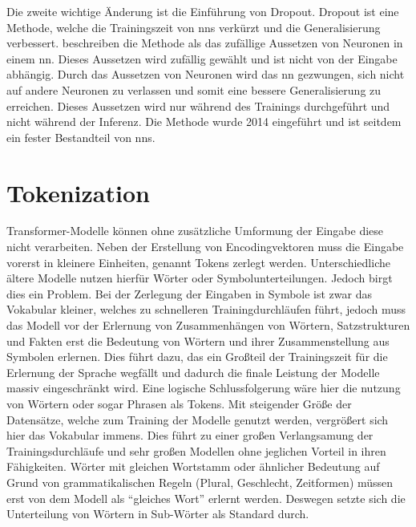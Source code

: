 Die zweite wichtige Änderung ist die Einführung von Dropout. 
Dropout ist eine Methode, welche die Trainingszeit von \ac{nn}s verkürzt und die Generalisierung verbessert. 
\citet{dropout} beschreiben die Methode als das zufällige Aussetzen von Neuronen in einem \ac{nn}. 
Dieses Aussetzen wird zufällig gewählt und ist nicht von der Eingabe abhängig. 
Durch das Aussetzen von Neuronen wird das \ac{nn} gezwungen, sich nicht auf andere Neuronen zu verlassen und somit eine bessere Generalisierung zu erreichen. 
Dieses Aussetzen wird nur während des Trainings durchgeführt und nicht während der Inferenz. 
Die Methode wurde 2014 eingeführt und ist seitdem ein fester Bestandteil von \ac{nn}s.\\

\section{Tokenization}\label{sec:tokenization}
Transformer-Modelle können ohne zusätzliche Umformung der Eingabe diese nicht verarbeiten.
Neben der Erstellung von Encodingvektoren muss die Eingabe vorerst in kleinere Einheiten, genannt Tokens zerlegt werden.
Unterschiedliche ältere Modelle nutzen hierfür Wörter oder Symbolunterteilungen.
Jedoch birgt dies ein Problem.
Bei der Zerlegung der Eingaben in Symbole ist zwar das Vokabular kleiner, welches zu schnelleren Trainingdurchläufen führt, jedoch muss das Modell vor der Erlernung von Zusammenhängen von Wörtern, Satzstrukturen und Fakten erst die Bedeutung von Wörtern und ihrer Zusammenstellung aus Symbolen erlernen.
Dies führt dazu, das ein Großteil der Trainingszeit für die Erlernung der Sprache wegfällt und dadurch die finale Leistung der Modelle massiv eingeschränkt wird.
Eine logische Schlussfolgerung wäre hier die nutzung von Wörtern oder sogar Phrasen als Tokens.
Mit steigender Größe der Datensätze, welche zum Training der Modelle genutzt werden, vergrößert sich hier das Vokabular immens.
Dies führt zu einer großen Verlangsamung der Trainingsdurchläufe und sehr großen Modellen ohne jeglichen Vorteil in ihren Fähigkeiten.
Wörter mit gleichen Wortstamm oder ähnlicher Bedeutung auf Grund von grammatikalischen Regeln (Plural, Geschlecht, Zeitformen) müssen erst von dem Modell als \enquote{gleiches Wort} erlernt werden.
Deswegen setzte sich die Unterteilung von Wörtern in Sub-Wörter als Standard durch.

